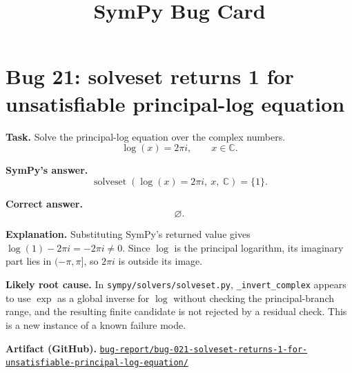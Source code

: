 \documentclass[11pt]{article}
\title{SymPy Bug Card}
\author{}
\date{}
\newcommand{\artifactrepo}{https://github.com/TODO-org/TODO-repo}
\newcommand{\bugbundle}[1]{\href{\artifactrepo/tree/main/bug-report/#1}{\nolinkurl{bug-report/#1/}}}
\begin{document}
\maketitle

\section*{Bug 21: solveset returns 1 for unsatisfiable principal-log equation}

\begin{counterexamplebox}
\textbf{Task.} Solve the principal-log equation over the complex numbers.
\[
  \log(x)=2\pi i,\qquad x\in\mathbb{C}.
\]

\medskip
\textbf{SymPy's answer.}
\[
  \operatorname{solveset}(\log(x)=2\pi i,\ x,\ \mathbb{C})=\{1\}.
\]

\medskip
\textbf{Correct answer.}
\[
  \varnothing.
\]

\medskip
\textbf{Explanation.} Substituting SymPy's returned value gives
\(\log(1)-2\pi i=-2\pi i\ne0\).  Since \(\log\) is the principal logarithm, its
imaginary part lies in \((-\pi,\pi]\), so \(2\pi i\) is outside its image.

\medskip
\textbf{Likely root cause.} In \nolinkurl{sympy/solvers/solveset.py},
\texttt{\_invert\_complex} appears to use \(\exp\) as a global inverse for
\(\log\) without checking the principal-branch range, and the resulting finite
candidate is not rejected by a residual check.  This is a new instance of a
known failure mode.

\medskip
\textbf{Artifact (GitHub).} \bugbundle{bug-021-solveset-returns-1-for-unsatisfiable-principal-log-equation}
\end{counterexamplebox}
\end{document}
